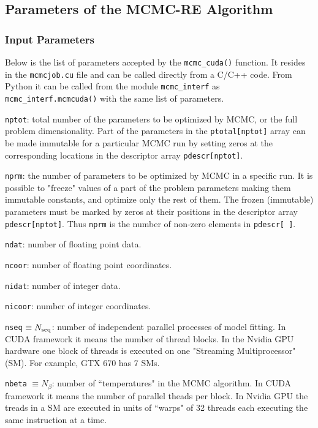 \documentclass[preprint2]{aastex}
\begin{document}
\subsection{Parameters of the MCMC-RE Algorithm} \label{algparams}

\subsubsection{Input Parameters}


Below is the list of parameters accepted by the \verb|mcmc_cuda()| function. 
It resides in the \verb|mcmcjob.cu| file and can be called directly from a C/C++ code. 
From Python it can be called from the module \verb|mcmc_interf| as \\
\verb|mcmc_interf.mcmcuda()| with the same list of parameters.

\verb|nptot|: total number of the parameters to be optimized by MCMC, or
       the full problem dimensionality. Part of the parameters in the
       \verb|ptotal[nptot]| array can be made immutable for a particular MCMC run
       by setting zeros at the corresponding locations in the descriptor
       array \verb|pdescr[nptot]|.

\verb|nprm|: the number of parameters to be optimized by MCMC in a specific run.
      It is possible to "freeze" values of a part of the problem parameters
      making them immutable constants, and optimize only the rest of them.
      The frozen (immutable) parameters must be marked by zeros at their
      positions in the descriptor array \verb|pdescr[nptot]|. Thus \verb|nprm| is the
      number of non-zero elements in \verb|pdescr[ ]|.

\verb|ndat|: number of floating point data.

\verb|ncoor|: number of floating point coordinates.

\verb|nidat|: number of integer data.

\verb|nicoor|: number of integer coordinates.

\verb|nseq| $\equiv N_{\rm seq}$: number of independent parallel processes of model fitting. In CUDA
      framework it means the number of thread blocks. In the Nvidia
      GPU hardware one block of threads is executed on one
      "Streaming Multiprocessor" (SM). For example, GTX 670 has 7 SMs. 

\verb|nbeta| $\equiv N_\beta$: number of ``temperatures" in the MCMC algorithm. In CUDA framework
       it means the number of parallel theads per block. In Nvidia GPU
       the treads in a SM are executed in units of ``warps" of 32 threads
       each executing the same instruction at a time.
       
\end{document}
